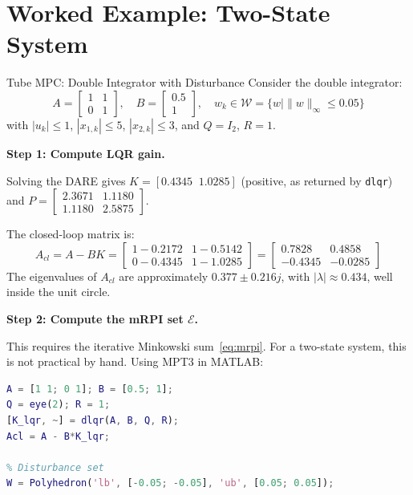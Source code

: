\section{Worked Example: Two-State System}
\label{sec:tube_example_2d}

\begin{examplebox}{Tube MPC: Double Integrator with Disturbance}
	Consider the double integrator:
	\[
	A = \begin{bmatrix} 1 & 1 \\ 0 & 1 \end{bmatrix}, \quad B = \begin{bmatrix} 0.5 \\ 1 \end{bmatrix}, \quad w_k \in \mathcal{W} = \{w \mid \|w\|_\infty \le 0.05\}
	\]
	with $|u_k| \le 1$, $|x_{1,k}| \le 5$, $|x_{2,k}| \le 3$, and $Q = I_2$, $R = 1$.

	\solution

	\textbf{Step 1: Compute LQR gain.}

	Solving the DARE gives $K = [0.4345 \;\; 1.0285]$ (positive, as returned by \texttt{dlqr}) and $P = \begin{bmatrix} 2.3671 & 1.1180 \\ 1.1180 & 2.5875 \end{bmatrix}$.

	The closed-loop matrix is:
	\[
	A_{cl} = A - BK = \begin{bmatrix} 1 - 0.2172 & 1 - 0.5142 \\ 0 - 0.4345 & 1 - 1.0285 \end{bmatrix} = \begin{bmatrix} 0.7828 & 0.4858 \\ -0.4345 & -0.0285 \end{bmatrix}
	\]
	The eigenvalues of $A_{cl}$ are approximately $0.377 \pm 0.216j$, with $|\lambda| \approx 0.434$, well inside the unit circle.

	\textbf{Step 2: Compute the mRPI set $\mathcal{E}$.}

	This requires the iterative Minkowski sum~\eqref{eq:mrpi}. For a two-state system, this is not practical by hand. Using MPT3 in MATLAB:

\begin{lstlisting}[language=Matlab]
A = [1 1; 0 1]; B = [0.5; 1];
Q = eye(2); R = 1;
[K_lqr, ~] = dlqr(A, B, Q, R);
Acl = A - B*K_lqr;

% Disturbance set
W = Polyhedron('lb', [-0.05; -0.05], 'ub', [0.05; 0.05]);


\end{lstlisting}
\end{examplebox}
